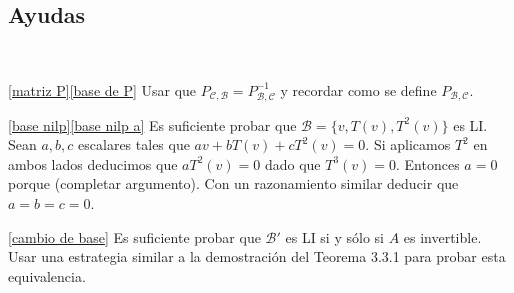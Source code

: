 \subsection*{Ayudas}

\

\ref{matriz P}\ref{base de P} Usar que $P_{\mathcal{C},\mathcal{B}}=P_{\mathcal{B},\mathcal{C}}^{-1}$ y recordar como se define $P_{\mathcal{B},\mathcal{C}}$.


\ref{base nilp}\ref{base nilp a} Es suficiente probar que $\mathcal{B}=\{v, T(v), T^2(v)\}$ es LI. Sean $a,b,c$ escalares tales que $av+bT(v)+cT^2(v)=0$. Si aplicamos $T^2$ en ambos lados deducimos que $aT^2(v)=0$ dado que $T^3(v)=0$. Entonces $a=0$ porque (completar argumento). Con un razonamiento similar deducir que $a=b=c=0$.


\ref{cambio de base} Es suficiente probar que $\mathcal{B}'$ es LI si y sólo si $A$ es invertible. Usar una estrategia similar a la demostración del Teorema 3.3.1 para probar esta equivalencia.
